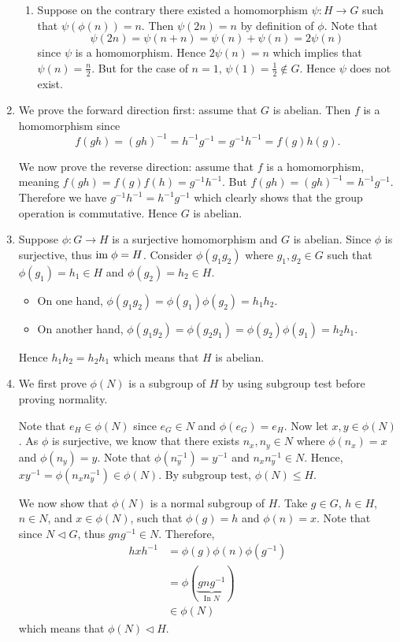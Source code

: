 \begin{enumerate}
\begin{enumerate}[label=(\alph*)]
        \item Suppose on the contrary there existed a homomorphism $\psi: H \to G$ such that $\psi(\phi(n)) = n$. Then $\psi(2n) = n$ by definition of $\phi$. Note that
        \[
            \psi(2n) = \psi(n + n) = \psi(n) + \psi(n) = 2\psi(n)
        \]
        since $\psi$ is a homomorphism. Hence $2\psi(n) = n$ which implies that $\psi(n) = \frac n2$. But for the case of $n = 1$, $\psi(1) = \frac 12 \notin G$. Hence $\psi$ does not exist.
    \end{enumerate}

    \item We prove the forward direction first: assume that $G$ is abelian. Then $f$ is a homomorphism since
    \[
        f(gh) = (gh)^{-1} = h^{-1}g^{-1} = g^{-1}h^{-1} = f(g)h(g).
    \]

    We now prove the reverse direction: assume that $f$ is a homomorphism, meaning $f(gh) = f(g)f(h) = g^{-1}h^{-1}$. But $f(gh) = (gh)^{-1} = h^{-1}g^{-1}$. Therefore we have $g^{-1}h^{-1} = h^{-1}g^{-1}$ which clearly shows that the group operation is commutative. Hence $G$ is abelian.

    \item Suppose $\phi: G \to H$ is a surjective homomorphism and $G$ is abelian. Since $\phi$ is surjective, thus $\mathrm{im}\; \phi = H$. Consider $\phi(g_1g_2)$ where $g_1, g_2 \in G$ such that $\phi(g_1) = h_1 \in H$ and $\phi(g_2) = h_2 \in H$.
    \begin{itemize}
        \item On one hand, $\phi(g_1g_2) = \phi(g_1)\phi(g_2) = h_1h_2$.
        \item On another hand, $\phi(g_1g_2) = \phi(g_2g_1) = \phi(g_2)\phi(g_1) = h_2h_1$.
    \end{itemize}
    Hence $h_1h_2 = h_2h_1$ which means that $H$ is abelian.

    \item We first prove $\phi(N)$ is a subgroup of $H$ by using subgroup test before proving normality.

    Note that $e_H \in \phi(N)$ since $e_G \in N$ and $\phi(e_G) = e_H$. Now let $x, y \in \phi(N)$. As $\phi$ is surjective, we know that there exists $n_x, n_y \in N$ where $\phi(n_x) = x$ and $\phi(n_y) = y$. Note that $\phi(n_y^{-1}) = y^{-1}$ and $n_xn_y^{-1} \in N$. Hence, $xy^{-1} = \phi(n_xn_y^{-1}) \in \phi(N)$. By subgroup test, $\phi(N) \leq H$.

    We now show that $\phi(N)$ is a normal subgroup of $H$. Take $g \in G$, $h \in H$, $n \in N$, and $x \in \phi(N)$, such that $\phi(g) = h$ and $\phi(n) = x$. Note that since $N \lhd G$, thus $gng^{-1} \in N$. Therefore,
    \begin{align*}
        hxh^{-1} &= \phi(g)\phi(n)\phi(g^{-1})\\
        &= \phi(\underbrace{gng^{-1}}_{\text{In }N})\\
        &\in \phi(N)
    \end{align*}
    which means that $\phi(N) \lhd H$.


\end{enumerate}
